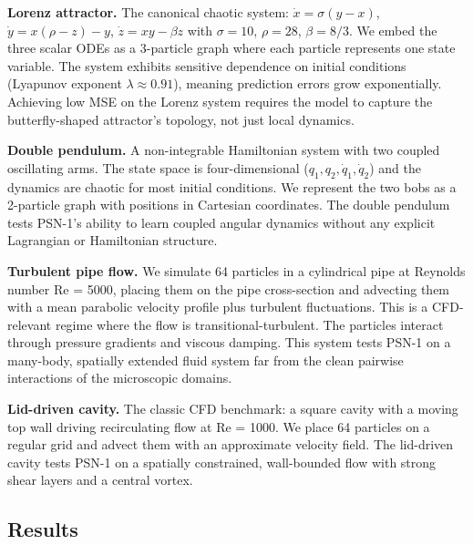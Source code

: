 \documentclass[10pt,twocolumn]{article}
\begin{document}
\textbf{Lorenz attractor.} The canonical chaotic system: $\dot{x} = \sigma(y-x)$, $\dot{y} = x(\rho-z)-y$, $\dot{z} = xy-\beta z$ with $\sigma=10$, $\rho=28$, $\beta=8/3$. We embed the three scalar ODEs as a 3-particle graph where each particle represents one state variable. The system exhibits sensitive dependence on initial conditions (Lyapunov exponent $\lambda \approx 0.91$), meaning prediction errors grow exponentially. Achieving low MSE on the Lorenz system requires the model to capture the butterfly-shaped attractor's topology, not just local dynamics.

\textbf{Double pendulum.} A non-integrable Hamiltonian system with two coupled oscillating arms. The state space is four-dimensional ($q_1, q_2, \dot{q}_1, \dot{q}_2$) and the dynamics are chaotic for most initial conditions. We represent the two bobs as a 2-particle graph with positions in Cartesian coordinates. The double pendulum tests PSN-1's ability to learn coupled angular dynamics without any explicit Lagrangian or Hamiltonian structure.

\textbf{Turbulent pipe flow.} We simulate 64 particles in a cylindrical pipe at Reynolds number Re = 5000, placing them on the pipe cross-section and advecting them with a mean parabolic velocity profile plus turbulent fluctuations. This is a CFD-relevant regime where the flow is transitional-turbulent. The particles interact through pressure gradients and viscous damping. This system tests PSN-1 on a many-body, spatially extended fluid system far from the clean pairwise interactions of the microscopic domains.

\textbf{Lid-driven cavity.} The classic CFD benchmark: a square cavity with a moving top wall driving recirculating flow at Re = 1000. We place 64 particles on a regular grid and advect them with an approximate velocity field. The lid-driven cavity tests PSN-1 on a spatially constrained, wall-bounded flow with strong shear layers and a central vortex.

\subsection{Results}
\end{document}

